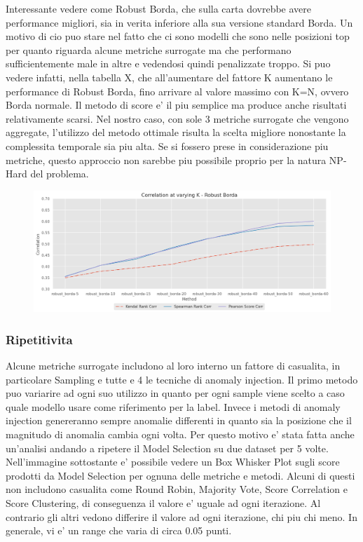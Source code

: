 Interessante vedere come Robust Borda, che sulla carta dovrebbe avere performance migliori, sia in verita inferiore alla sua versione standard Borda. Un motivo di cio puo stare nel fatto che ci sono modelli che sono nelle posizioni top per quanto riguarda alcune metriche surrogate ma che performano sufficientemente male in altre e vedendosi quindi penalizzate troppo.
Si puo vedere infatti, nella tabella X, che all'aumentare del fattore K aumentano le performance di Robust Borda, fino arrivare al valore massimo con K=N, ovvero Borda normale.
Il metodo di score e' il piu semplice ma produce anche risultati relativamente scarsi. Nel nostro caso, con sole 3 metriche surrogate che vengono aggregate, l'utilizzo del metodo ottimale risulta la scelta migliore nonostante la complessita temporale sia piu alta. Se si fossero prese in considerazione piu metriche, questo approccio non sarebbe piu possibile proprio per la natura NP-Hard del problema.

\begin{figure}[t]
\includegraphics[width=14cm, scale=1]{images/varying-k}
\centering
\end{figure}

\subsubsection{Ripetitivita}
Alcune metriche surrogate includono al loro interno un fattore di casualita, in particolare Sampling e tutte e 4 le tecniche di anomaly injection. Il primo metodo puo variarire ad ogni suo utilizzo in quanto per ogni sample viene scelto a caso quale modello usare come riferimento per la label. Invece i metodi di anomaly injection genereranno sempre anomalie differenti in quanto sia la posizione che il magnitudo di anomalia cambia ogni volta.
Per questo motivo e' stata fatta anche un'analisi andando a ripetere il Model Selection su due dataset per 5 volte.
Nell'immagine sottostante e' possibile vedere un Box Whisker Plot sugli score prodotti da Model Selection per ognuna delle metriche e metodi. Alcuni di questi non includono casualita come Round Robin, Majority Vote, Score Correlation e Score Clustering, di conseguenza il valore e' uguale ad ogni iterazione. Al contrario gli altri vedono differire il valore ad ogni iterazione, chi piu chi meno. In generale, vi e' un range che varia di circa 0.05 punti.

